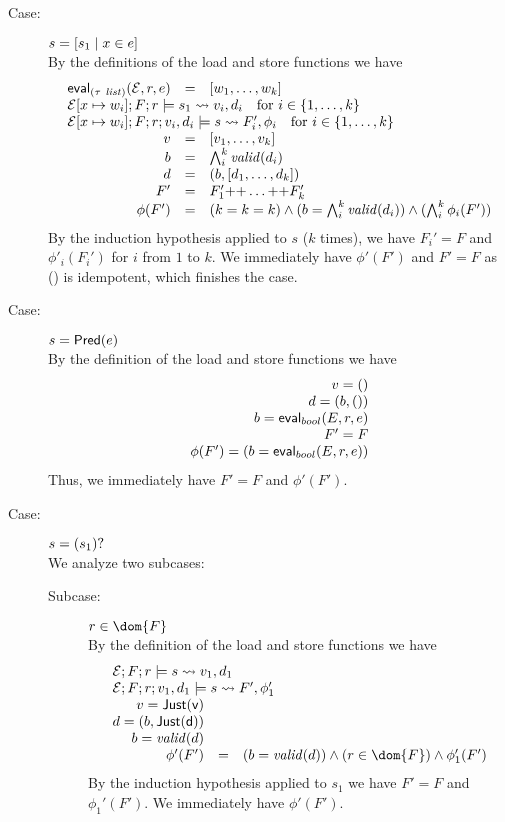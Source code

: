 {\begin{description}
\item[Case:] $s = [ s_1 \mid x \in e ]$\\[1ex]
%
By the definitions of the load and store functions we have 
\[ 
\begin{array}{rcll}
\eval{(\tau\ \mathit{list})}{\Env,r,e} &=& [w_1,\dots,w_k ]\\
\multicolumn{3}{l}{\load{\Env[ x \mapsto w_i]}{F}{r}{s_1}{v_i,d_i} \quad \text{for}~i \in \{1,\dots,k\}} \\
\multicolumn{3}{l}{\store{\Env[x \mapsto w_i]}{F}{r}{v_i,d_i}{s}{F_i',\phi_i} \quad \text{for}~i \in \{1,\dots,k\}}\\
v &=& [v_1,\dots,v_k]\\
b &= &\bigwedge_i^k \valid{d_i}\\
d &=& (b,[d_1,\dots,d_k])\\
F' &=& F_1' \FAppend \dots \FAppend F_k'\\
\phi(F') &=& (k = k = k) \wedge (b = \bigwedge_i^k \valid{d_i}) \wedge (\bigwedge_i^k \phi_i(F'))\\
\end{array}
\]
By the induction hypothesis applied to $s$ ($k$ times), we have $F_i'
= F$ and $\phi'_i(F_i')$ for $i$ from $1$ to $k$. We immediately have
$\phi'(F')$ and $F' = F$ as (\FAppend) is idempotent, which finishes
the case.

\item[Case:] $s = \mathsf{Pred}(e)$\\[1ex]
%
By the definition of the load and store functions we have
\[
\begin{array}{rcll}
v = ()\\
d = (b,())\\
b = \mathsf{eval}_{bool}(E,r,e)\\
F' = F\\
\phi(F') = (b = \mathsf{eval}_{bool}(E,r,e))\\
\end{array}
\]
Thus, we immediately have $F' = F$ and $\phi'(F')$.

\item[Case:] $s = (s_1)?$\\[1ex]
%
We analyze two subcases:
\begin{description}
\item[Subcase:] $r \in \dom{F}$\\[1ex]
%
By the definition of the load and store functions we have
\[ 
\begin{array}{rcll}
\multicolumn{3}{l}{\load{\Env}{F}{r}{s}{v_1,d_1}}\\
\multicolumn{3}{l}{\store{\Env}{F}{r}{v_1,d_1}{s}{ F',\phi_1' }}\\
v = \Just{v}\\
d = (b,\Just{d})\\
b = \valid{d}\\
\phi'(F') &=& (b = \valid{d}) \wedge (r \in \dom{F}) \wedge \phi_1'(F')
\end{array}
\]
%
By the induction hypothesis applied to $s_1$ we have $F' = F$ and
$\phi_1'(F')$. We immediately have $\phi'(F')$.


\end{description}
\end{description}}
